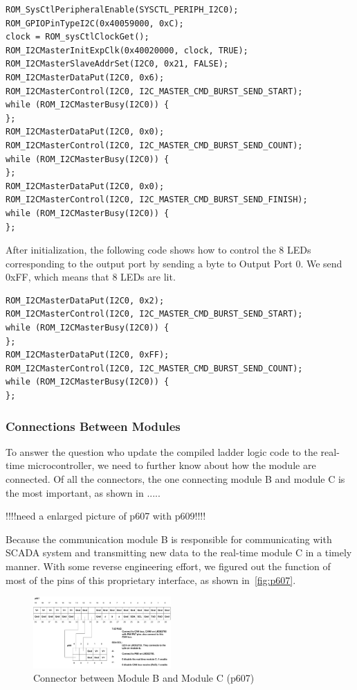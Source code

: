 \begin{lstlisting}[style=code, caption={Pseud Code for Initializing the I2C Slave Device for the Ouput Port LED Lights}, captionpos=b]
ROM_SysCtlPeripheralEnable(SYSCTL_PERIPH_I2C0);
ROM_GPIOPinTypeI2C(0x40059000, 0xC);
clock = ROM_sysCtlClockGet();
ROM_I2CMasterInitExpClk(0x40020000, clock, TRUE);
ROM_I2CMasterSlaveAddrSet(I2C0, 0x21, FALSE);
ROM_I2CMasterDataPut(I2C0, 0x6);
ROM_I2CMasterControl(I2C0, I2C_MASTER_CMD_BURST_SEND_START);
while (ROM_I2CMasterBusy(I2C0)) {
};
ROM_I2CMasterDataPut(I2C0, 0x0);
ROM_I2CMasterControl(I2C0, I2C_MASTER_CMD_BURST_SEND_COUNT);
while (ROM_I2CMasterBusy(I2C0)) {
};
ROM_I2CMasterDataPut(I2C0, 0x0);
ROM_I2CMasterControl(I2C0, I2C_MASTER_CMD_BURST_SEND_FINISH);
while (ROM_I2CMasterBusy(I2C0)) {
};
\end{lstlisting}

After initialization, the following code shows how to control the 8 LEDs corresponding to the output port by sending a byte to Output Port 0. We send 0xFF, which means that 8 LEDs are lit.
\begin{lstlisting}[style=code, caption={Pseud Code for Controlling LED Lights}, captionpos=b]
ROM_I2CMasterDataPut(I2C0, 0x2);
ROM_I2CMasterControl(I2C0, I2C_MASTER_CMD_BURST_SEND_START);
while (ROM_I2CMasterBusy(I2C0)) {
};
ROM_I2CMasterDataPut(I2C0, 0xFF);
ROM_I2CMasterControl(I2C0, I2C_MASTER_CMD_BURST_SEND_COUNT);
while (ROM_I2CMasterBusy(I2C0)) {
};
\end{lstlisting}


\subsubsection{Connections Between Modules}

To answer the question who update the compiled ladder logic code to the real-time microcontroller, we need to further know about how the module are connected. Of all the connectors, the one connecting module B and module C is the most important, as shown in ..... 

!!!!need a enlarged picture of p607 with p609!!!!

Because the communication module B is responsible for communicating with SCADA system and transmitting new data to the real-time module C in a timely manner. With some reverse engineering effort, we figured out the function of most of the pins of this proprietary interface, as shown in~\autoref{fig:p607}.

\begin{figure}[th]
	\includegraphics[width=0.47\textwidth]{figures/p607}
	\centering
	\caption{Connector between Module B and Module C (p607)}
	\label{fig:p607}
\end{figure}

